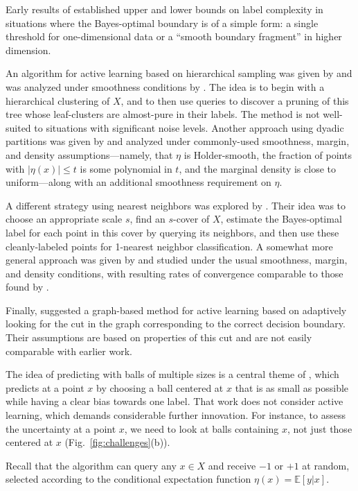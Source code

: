 \documentclass[twoside]{article}
\def\E{{\mathbb E}}
\begin{document}
Early results of \cite{CN08} established upper and lower bounds on label complexity in situations where the Bayes-optimal boundary is of a simple form: a single threshold for one-dimensional data or a ``smooth boundary fragment'' in higher dimension.

An algorithm for active learning based on hierarchical sampling was given by \cite{DH08} and was analyzed under smoothness conditions by \cite{KUB15}. The idea is to begin with a hierarchical clustering of $X$, and to then use queries to discover a pruning of this tree whose leaf-clusters are almost-pure in their labels. The method is not well-suited to situations with significant noise levels. Another approach using dyadic partitions was given by \cite{M12} and analyzed under commonly-used smoothness, margin, and density assumptions---namely, that $\eta$ is Holder-smooth, the fraction of points with $|\eta(x)| \leq t$ is some polynomial in $t$, and the marginal density is close to uniform---along with an additional smoothness requirement on $\eta$.

A different strategy using nearest neighbors was explored by \cite{ASU18}. Their idea was to choose an appropriate scale $s$, find an $s$-cover of $X$, estimate the Bayes-optimal label for each point in this cover by querying its neighbors, and then use these cleanly-labeled points for 1-nearest neighbor classification. A somewhat more general approach was given by \cite{H17} and studied under the usual smoothness, margin, and density conditions, with resulting rates of convergence comparable to those found by \cite{M12}.

Finally, \cite{DNZ15} suggested a graph-based method for active learning based on adaptively looking for the cut in the graph corresponding to the correct decision boundary. Their assumptions are based on properties of this cut and are not easily comparable with earlier work.

The idea of predicting with balls of multiple sizes is a central theme of \cite{BDFM19}, which predicts at a point $x$ by choosing a ball centered at $x$ that is as small as possible while having a clear bias towards one label. That work does not consider active learning, which demands considerable further innovation. For instance, to assess the uncertainty at a point $x$, we need to look at balls containing $x$, not just those centered at $x$ (Fig.~\ref{fig:challenges}(b)).


Recall that the algorithm can query any $x \in X$ and receive $-1$ or $+1$ at random,
selected according to the conditional expectation function $\eta(x) = \E[y|x]$.
\end{document}
